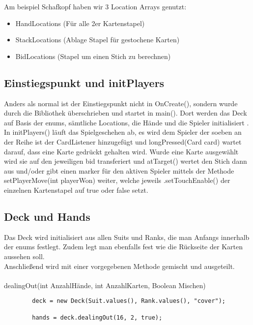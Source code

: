 Am beispiel Schafkopf haben wir 3 Location Arrays genutzt:\\
\begin{itemize}
\item HandLocations (Für alle 2er Kartenstapel)
\item StackLocations (Ablage Stapel für gestochene Karten)
\item BidLocations (Stapel um einen Stich zu berechnen)
\end{itemize}

\subsection{Einstiegspunkt und initPlayers}
Anders als normal ist der Einstiegspunkt nicht in OnCreate(), sondern wurde durch die Bibliothek überschrieben und startet in main(). Dort werden das Deck auf Basis der enums, sämtliche Locations, die Hände und die Spieler initialisiert . In initPlayers() läuft das Spielgeschehen ab, es wird dem Spieler der soeben an der Reihe ist der CardListener hinzugefügt und longPressed(Card card) wartet darauf, dass eine Karte gedrückt gehalten wird. Wurde eine Karte ausgewählt wird sie auf den jeweiligen bid transferiert und atTarget() wertet den Stich dann aus und/oder gibt einen marker für den aktiven Spieler mittels der Methode setPlayerMove(int playerWon) weiter, welche jeweils .setTouchEnable() der einzelnen Kartenstapel auf true oder false setzt.\\



\subsection{Deck und Hands}
Das Deck wird initialisiert aus allen Suits und Ranks, die man Anfangs innerhalb der enums festlegt. Zudem legt man ebenfalls fest wie die Rückseite der Karten aussehen soll. \\
Anschließend wird mit einer vorgegebenen Methode gemischt und ausgeteilt.\\
\\
dealingOut(int AnzahlHände, int AnzahlKarten, Boolean Mischen)


      \begin{lstlisting}
        deck = new Deck(Suit.values(), Rank.values(), "cover");

        hands = deck.dealingOut(16, 2, true);
	\end{lstlisting}



